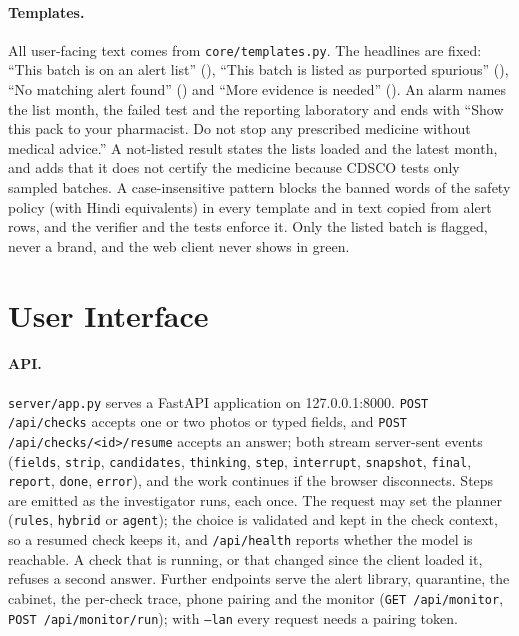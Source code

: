 \paragraph{Templates.} All user-facing text comes from \texttt{core/templates.py}. The headlines are fixed: ``This batch is on an alert list'' (\FLAGGED), ``This batch is listed as purported spurious'' (\SFAKE), ``No matching alert found'' (\NLISTED) and ``More evidence is needed'' (\CANTV). An alarm names the list month, the failed test and the reporting laboratory and ends with ``Show this pack to your pharmacist. Do not stop any prescribed medicine without medical advice.'' A not-listed result states the lists loaded and the latest month, and adds that it does not certify the medicine because CDSCO tests only sampled batches. A case-insensitive pattern blocks the banned words of the safety policy (with Hindi equivalents) in every template and in text copied from alert rows, and the verifier and the tests enforce it. Only the listed batch is flagged, never a brand, and the web client never shows \NLISTED{} in green.

\section{User Interface}
\label{sec:impl-user-interface}

\paragraph{API.} \texttt{server/app.py} serves a FastAPI application on 127.0.0.1:8000. \texttt{POST /api/checks} accepts one or two photos or typed fields, and \texttt{POST /api/checks/<id>/resume} accepts an answer; both stream server-sent events (\texttt{fields}, \texttt{strip}, \texttt{candidates}, \texttt{thinking}, \texttt{step}, \texttt{interrupt}, \texttt{snapshot}, \texttt{final}, \texttt{report}, \texttt{done}, \texttt{error}), and the work continues if the browser disconnects. Steps are emitted as the investigator runs, each once. The request may set the planner (\texttt{rules}, \texttt{hybrid} or \texttt{agent}); the choice is validated and kept in the check context, so a resumed check keeps it, and \texttt{/api/health} reports whether the model is reachable. A check that is running, or that changed since the client loaded it, refuses a second answer. Further endpoints serve the alert library, quarantine, the cabinet, the per-check trace, phone pairing and the monitor (\texttt{GET /api/monitor}, \texttt{POST /api/monitor/run}); with \texttt{--lan} every request needs a pairing token.

